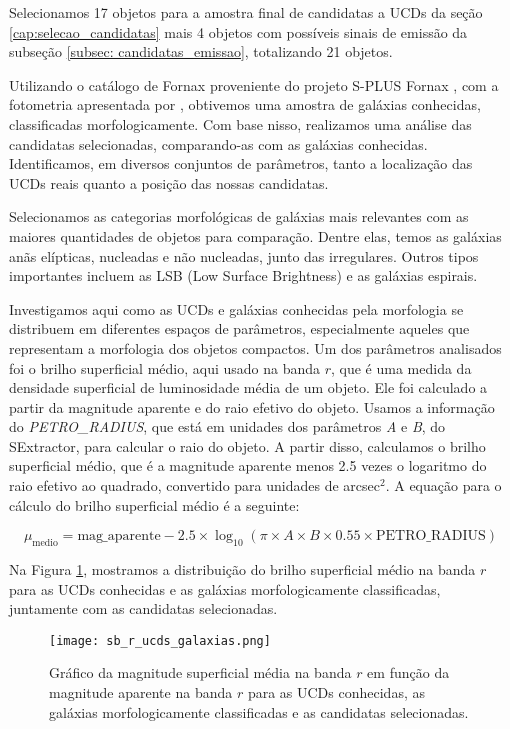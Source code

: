Selecionamos 17 objetos para a amostra final de candidatas a UCDs da seção \ref{cap:selecao_candidatas} mais 4 objetos com possíveis sinais de emissão da subseção \ref{subsec: candidatas_emissao}, totalizando 21 objetos.

Utilizando o catálogo de Fornax proveniente do projeto S-PLUS Fornax \citep{castelli2024splusfornaxprojectsfp}, com a fotometria apresentada por \citep{haack2024splusfornaxprojectsfp}, obtivemos uma amostra de galáxias conhecidas, classificadas morfologicamente. Com base nisso, realizamos uma análise das candidatas selecionadas, comparando-as com as galáxias conhecidas. Identificamos, em diversos conjuntos de parâmetros, tanto a localização das UCDs reais quanto a posição das nossas candidatas.

Selecionamos as categorias morfológicas de galáxias mais relevantes com as maiores quantidades de objetos para comparação. Dentre elas, temos as galáxias anãs elípticas, nucleadas e não nucleadas, junto das irregulares. Outros tipos importantes incluem as LSB (Low Surface Brightness) e as galáxias espirais.

Investigamos aqui como as UCDs e galáxias conhecidas pela morfologia se distribuem em diferentes espaços de parâmetros, especialmente aqueles que representam a morfologia dos objetos compactos. Um dos parâmetros analisados foi o brilho superficial médio, aqui usado na banda $r$, que é uma medida da densidade superficial de luminosidade média de um objeto. Ele foi calculado a partir da magnitude aparente e do raio efetivo do objeto. Usamos a informação do \textit{PETRO\_RADIUS}, que está em unidades dos parâmetros \textit{A} e \textit{B}, do SExtractor, para calcular o raio do objeto. A partir disso, calculamos o brilho superficial médio, que é a magnitude aparente menos 2.5 vezes o logaritmo do raio efetivo ao quadrado, convertido para unidades de arcsec$^2$. A equação para o cálculo do brilho superficial médio é a seguinte:

\begin{equation}
    \mu_{\text{medio}} = \text{mag\_aparente} - 2.5 \times \log_{10}(\pi \times A \times B \times 0.55 \times \text{PETRO\_RADIUS})
    \label{equation_sb}
\end{equation}

Na Figura \ref{sb_r_ucds_galaxias}, mostramos a distribuição do brilho superficial médio na banda $r$ para as UCDs conhecidas e as galáxias morfologicamente classificadas, juntamente com as candidatas selecionadas.

\begin{figure}[!ht]
    \begin{center}
    \texttt{[image: sb\_r\_ucds\_galaxias.png]}
    \caption[]{Gráfico da magnitude superficial média na banda $r$ em função da magnitude aparente na banda $r$ para as UCDs conhecidas, as galáxias morfologicamente classificadas e as candidatas selecionadas.}
    \label{sb_r_ucds_galaxias}
    \end{center}
\end{figure}


